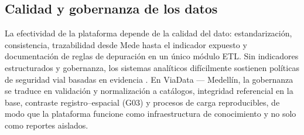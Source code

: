 \subsection{Calidad y gobernanza de los datos}
La efectividad de la plataforma depende de la calidad del dato: estandarización, consistencia, trazabilidad desde Mede hasta el indicador expuesto y documentación de reglas de depuración en un único módulo ETL. Sin indicadores estructurados y gobernanza, los sistemas analíticos difícilmente sostienen políticas de seguridad vial basadas en evidencia \cite{oviedo2025,oms2024}. En ViaData — Medellín, la gobernanza se traduce en validación y normalización a catálogos, integridad referencial en la base, contraste registro--espacial (G03) y procesos de carga reproducibles, de modo que la plataforma funcione como infraestructura de conocimiento y no solo como reportes aislados.
